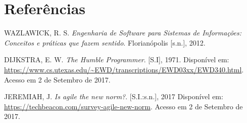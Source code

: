 \documentclass[
    12pt,       %
    openright,      %
    twoside,      %
    a4paper,      %
    english,      %
    french,       %
    spanish,      %
    brazil,       %
    ]{abntex2}
\begin{document}










  \postextual


  
  \chapter*{Referências}
  \noindent
  WAZLAWICK, R. S. \textit{Engenharia de Software para Sistemas de Informações: Conceitos e práticas que fazem sentido}. Florianópolis [s.n.], 2012.

  \noindent
  DIJKSTRA, E. W. \textit{The Humble Programmer}. [S.I], 1971. Disponível em:
  \url{https://www.cs.utexas.edu/~EWD/transcriptions/EWD03xx/EWD340.html}.
  Acesso em 2 de Setembro de 2017.

  \noindent
  JEREMIAH, J. \textit{Is agile the new norm?}. [S.I.:s.n.], 2017 Disponível em:
  \url{https://techbeacon.com/survey-agile-new-norm}. Acesso em 2 de Setembro de 2017.
\end{document}

